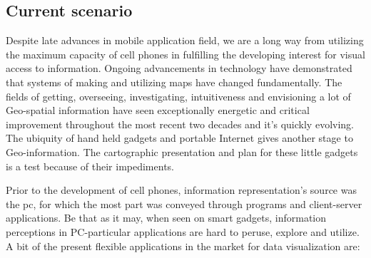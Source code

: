 \subsection{Current scenario}

Despite late advances in mobile application field, we are a long way from utilizing the maximum capacity of cell phones in fulfilling the developing interest for visual access to information. Ongoing advancements in technology have demonstrated that systems of making and utilizing maps have changed fundamentally. The fields of getting, overseeing, investigating, intuitiveness and envisioning a lot of Geo-spatial information have seen exceptionally energetic and critical improvement throughout the most recent two decades and it's quickly evolving. The ubiquity of hand held gadgets and portable Internet gives another stage to Geo-information. The cartographic presentation and plan for these little gadgets is a test because of their impediments.

Prior to the development of cell phones, information representation's source was the \gls{pc}, for which the most part was conveyed through programs and client-server applications. Be that as it may, when seen on smart gadgets, information perceptions in PC-particular applications are hard to peruse, explore and utilize. A bit of the present flexible applications in the market for data visualization are:

